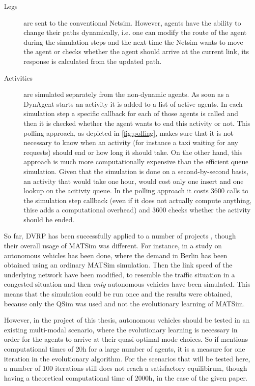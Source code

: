 \begin{description}
\item[Legs] are sent to the conventional Netsim. However, agents have the ability
to change their paths dynamically, i.e. one can modify the route of the agent
during the simulation steps and the next time the Netsim wants to move the agent
or checks whether the agent should arrive at the current link, its response is
calculated from the updated path.
\item[Activities] are simulated separately from the non-dynamic agents. As soon
as a DynAgent starts an activity it is added to a list of active agents. In each
simulation step a specific callback for each of those agents is called and then
it is checked whether the agent wants to end this activity or not.
This polling approach, as depicted in \cref{fig:polling}, makes sure that it is
not necessary to know when an activity (for instance a taxi waiting for any
requests) should end or how long it should take. On the other hand, this approach
is much more computationally expensive than the efficient queue simulation.
Given that the simulation is done on a second-by-second basis, an activity that
would take one hour, would cost only one insert and one lookup on the acitivty queue.
In the polling approach it costs 3600 calls to the simulation step callback (even
if it does not actually compute anything, thise adds a computational overhead) and
3600 checks whether the activity should be ended.
\end{description}

So far, DVRP has been successfully applied to a number of projects ,
though their overall usage of MATSim was different. For instance, in \citet{Bischoff2016}
a study on autonomous vehicles has been done, where the demand in Berlin has been
obtained using an ordinary MATSim simulation. Then the link speed of the underlying
network have been modified, to resemble the traffic situation in a congested
situation and then \textit{only} autonomous vehicles have been simulated. This
means that the simulation could be run once and the results were obtained, because
only the QSim was used and not the evolutionary learning of MATSim.

However, in the project of this thesis, autonomous vehicles should be tested in
an existing multi-modal scenario, where the evolutionary learning is necessary
in order for the agents to arrive at their quasi-optimal mode choices. So if
\citet{Bischoff2016} mentions computational times of 20h for a large number of agents,
it is a measure for one iteration in the evolutionary algorithm. For the scenarios
that will be tested here, a number of 100 iterations still does not reach a satisfactory
equilibirum, though having a theoretical computational time of 2000h, in the case
of the given paper.

